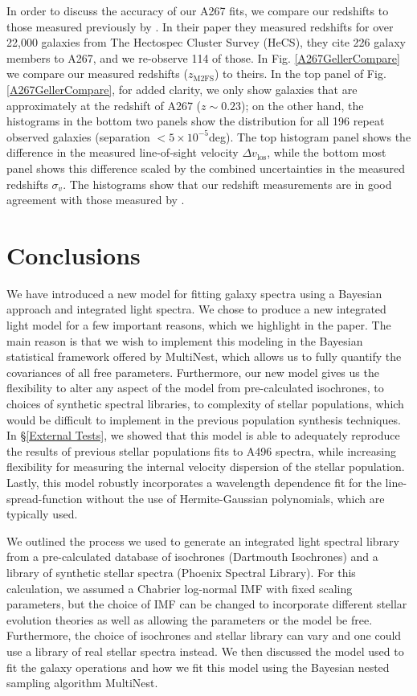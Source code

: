 \documentclass[twocolumn]{aastex6}
\begin{document}
In order to discuss the accuracy of our A267 fits, we compare our redshifts to those measured previously by \citet{Rines2013}.
In their paper they measured redshifts for over 22,000 galaxies from The Hectospec Cluster Survey (HeCS), they cite 226 galaxy members to A267, and we re-observe 114 of those.
In Fig. \ref{A267GellerCompare} we compare our measured redshifts ($z_\mathrm{M2FS}$) to theirs.
In the top panel of Fig. \ref{A267GellerCompare}, for added clarity, we only show galaxies that are approximately at the redshift of A267 ($z\sim0.23$); on the other hand, the histograms in the bottom two panels show the distribution for all 196 repeat observed galaxies (separation $<5\times10^{-5}$deg).
The top histogram panel shows the difference in the measured line-of-sight velocity $\Delta v_\mathrm{los}$, while the bottom most panel shows this difference scaled by the combined uncertainties in the measured redshifts $\sigma_v$.
The histograms show that our redshift measurements are in good agreement with those measured by \citet{Rines2013}.


\section{Conclusions}
\label{conclusions}
We have introduced a new model for fitting galaxy spectra using a Bayesian approach and integrated light spectra.
We chose to produce a new integrated light model for a few important reasons, which we highlight in the paper.
The main reason is that we wish to implement this modeling in the Bayesian statistical framework offered by MultiNest, which allows us to fully quantify the covariances of all free parameters.
Furthermore, our new model gives us the flexibility to alter any aspect of the model from pre-calculated isochrones, to choices of synthetic spectral libraries, to complexity of stellar populations, which would be difficult to implement in the previous population synthesis techniques.
In \S\ref{External Tests}, we showed that this model is able to adequately reproduce the results of previous stellar populations fits to A496 spectra, while increasing flexibility for measuring the internal velocity dispersion of the stellar population.
Lastly, this model robustly incorporates a wavelength dependence fit for the line-spread-function without the use of Hermite-Gaussian polynomials, which are typically used.

We outlined the process we used to generate an integrated light spectral library from a pre-calculated database of isochrones (Dartmouth Isochrones) and a library of synthetic stellar spectra (Phoenix Spectral Library).
For this calculation, we assumed a Chabrier log-normal IMF with fixed scaling parameters, but the choice of IMF can be changed to incorporate different stellar evolution theories as well as allowing the parameters or the model be free.
Furthermore, the choice of isochrones and stellar library can vary and one could use a library of real stellar spectra instead.
We then discussed the model used to fit the galaxy operations and how we fit this model using the Bayesian nested sampling algorithm MultiNest.
\end{document}
